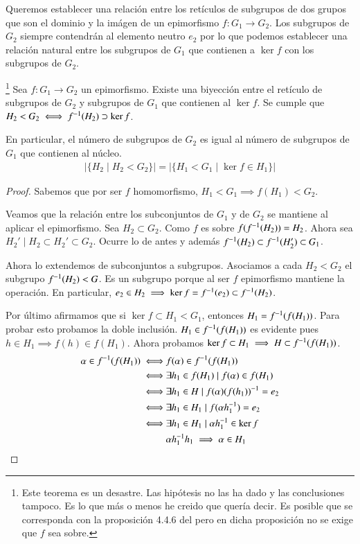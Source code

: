Queremos establecer una relación entre los retículos de subgrupos de dos grupos que son el dominio y la imágen de un epimorfismo $f: G_1 \to G_2$. Los subgrupos de $G_2$ siempre contendrán al elemento neutro $e_2$ por lo que podemos establecer una relación natural entre los subgrupos de $G_1$ que contienen a $\ker f$ con los subgrupos de $G_2$.

\begin{thm}\label{thm:correspondenciasubgrupos}\footnote{Este teorema es un desastre. Las hipótesis no las ha dado y las conclusiones tampoco. Es lo que más o menos he creido que quería decir. Es posible que se corresponda con la proposición 4.4.6 del \cite{dor96} pero en dicha proposición no se exige que $f$ sea sobre.}
	Sea $f: G_1 \to G_2$ un epimorfismo. Existe una biyección entre el retículo de subgrupos de $G_2$ y subgrupos de $G_1$ que contienen al $\ker f$. Se cumple que $H_2 < G_2 \iff f^{-1}(H_2) \supset \ker f$.
	
	En particular, el número de subgrupos de $G_2$ es igual al número de subgrupos de $G_1$ que contienen al núcleo.
	\begin{align*}
		|\{H_2 \mid H_2 < G_2\}| = |\{H_1 < G_1 \mid \ker f \in H_1\}|
	\end{align*}
\end{thm}

\begin{proof}
	Sabemos que por ser $f$ homomorfismo, $H_1 < G_1 \implies f(H_1) < G_2$.
	
	Veamos que la relación entre los subconjuntos de $G_1$ y de $G_2$ se mantiene al aplicar el epimorfismo. Sea $H_2 \subset G_2$. Como $f$ es sobre $f(f^{-1}(H_2)) = H_2$. Ahora sea $H_2' \mid H_2 \subset H_2' \subset G_2$. Ocurre lo de antes y además $f^{-1}(H_2) \subset f^{-1}(H_2') \subset G_1$.
	
	Ahora lo extendemos de subconjuntos a subgrupos. Asociamos a cada $H_2 < G_2$ el subgrupo $f^{-1}(H_2) < G$. Es un subgrupo porque al ser $f$ epimorfismo mantiene la operación. En particular, $e_2 \in H_2 \implies \ker f = f^{-1}(e_2) \subset f^{-1}(H_2)$.
	
	Por último afirmamos que si $\ker f \subset H_1 < G_1$, entonces $H_1 = f^{-1}(f(H_1))$. Para probar esto probamos la doble inclusión. $H_1 \in f^{-1}(f(H_1))$ es evidente pues $h \in H_1 \implies f(h) \in f(H_1)$. Ahora probamos $\ker f \subset H_1 \implies H \subset f^{-1}(f(H_1))$.
	\begin{align*}
		\alpha \in f^{-1}(f(H_1)) \iff& f(\alpha) \in f^{-1}(f(H_1)) \\
		\iff& \exists h_1 \in f(H_1) \mid f(\alpha) \in f(H_1) \\
		\iff& \exists h_1 \in H \mid f(\alpha)(f(h_1))^{-1} = e_2 \\
		\iff& \exists h_1 \in H_1 \mid f(\alpha h_1^{-1}) = e_2 \\
		\iff& \exists h_1 \in H_1 \mid \alpha h_1^{-1} \in \ker f \\
		&\alpha h_1^{-1} h_1 \implies \alpha \in H_1
	\end{align*}
\end{proof}

